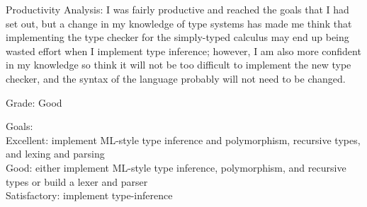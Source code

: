 \documentclass{article}
\begin{document}
Productivity Analysis:
I was fairly productive and reached the goals that I had set out, but a change in my knowledge of type systems has made me think that implementing the type checker for the simply-typed calculus may end up being wasted effort when I implement type inference; however, I am also more confident in my knowledge so think it will not be too difficult to implement the new type checker, and the syntax of the language probably will not need to be changed.

Grade:
Good

Goals:\\
Excellent: implement ML-style type inference and polymorphism, recursive types, and lexing and parsing\\
Good: either implement ML-style type inference, polymorphism, and recursive types or build a lexer and parser\\
Satisfactory: implement type-inference 
\end{document}
